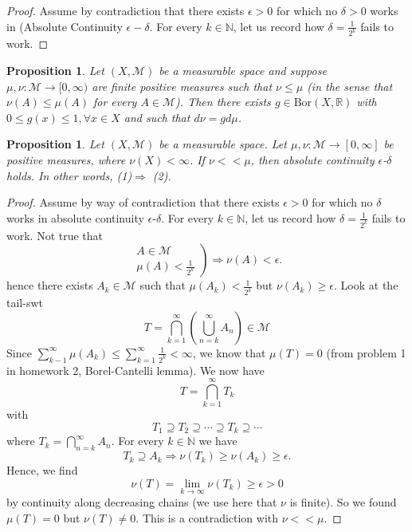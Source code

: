 \documentclass[letterpaper, 12pt]{article}
\newcommand{\cM}{\mathcal{M}}
\newcommand{\bR}{\mathbb{R}}
\newcommand{\bN}{\mathbb{N}}
\newcommand{\Bor}{\mathrm{Bor}}
\theoremstyle{stdthm}
\newtheorem{prop}[thm]{Proposition}
\theoremstyle{stddef}
\theoremstyle{stdnonum}
\theoremstyle{stdqands}
\theoremstyle{stdbold}
\begin{document}
\begin{proof}
 Assume by contradiction that there exists $\epsilon > 0$ for which no $\delta > 0$ works in (Absolute Continuity $\epsilon - \delta$. For every $ k \in \bN$, let us record how $\delta = \frac{1}{2^k}$ fails to work. 
 \end{proof}
 \begin{prop}
 Let $(X,\cM)$ be a measurable space and suppose $\mu,\nu: \cM \to [0,\infty)$ are finite positive measures such that $\nu \leq \mu$ (in the sense that $\nu(A) \leq \mu(A)$ for every $A \in \cM$). Then there exists $g\in \Bor(X,\bR)$ with $0\leq g(x) \leq 1, \forall x \in X$ and such that $d\nu = gd\mu$.
\end{prop}




\begin{prop}
Let $(X,\cM)$ be a measurable space. Let $\mu,\nu:\cM\to [0,\infty]$ be positive measures, where $\nu(X)<\infty$. If $\nu<<\mu$, then absolute continuity $\epsilon$-$\delta$ holds. In other words, (1)$\Longrightarrow$ (2).
\end{prop}

\begin{proof}
Assume by way of contradiction that there exists $\epsilon>0$ for which no $\delta$ works in absolute continuity $\epsilon$-$\delta$. For every $k\in\bN$, let us record how $\delta=\frac{1}{2^k}$ fails to work. Not true that 
\[
\left.
\begin{array}{c}
A\in\cM\\
\mu(A)<\frac{1}{2^k}
\end{array}
\right) \Longrightarrow \nu(A)<\epsilon.
\]
hence there exists $A_k\in \cM$ such that $\mu(A_k)<\frac{1}{2^k}$ but $\nu(A_k)\geq\epsilon$. Look at the tail-swt
\[
T=\bigcap_{k=1}^\infty\left(\bigcup_{n=k}^\infty A_n \right)\in\cM
\]
Since $\sum_{k-1}^\infty \mu(A_k)\leq \sum_{k=1}^\infty\frac{1}{2^k}<\infty$, we know that $\mu(T)=0$ (from problem 1 in homework 2, Borel-Cantelli lemma).
We now have
\[
T=\bigcap_{k=1}^\infty T_k
\]
with
\[
T_1\supseteq T_2 \supseteq \cdots \supseteq T_k \supseteq \cdots
\]
where $T_k = \bigcap_{n=k}^\infty A_n$. For every $k\in\bN$ we have 
\[
T_k\supseteq A_k \Longrightarrow \nu(T_k) \geq \nu(A_k) \geq \epsilon.
\]
Hence, we find
\[
\nu(T) = \lim_{k\to \infty} \nu(T_k)\geq \epsilon>0
\]
by continuity along decreasing chains (we use here that $\nu$ is finite).
So we found $\mu(T)=0$ but $\nu(T)\neq 0$. This is a contradiction with $\nu << \mu$.
\end{proof}
\end{document}
